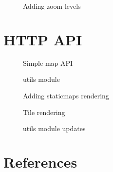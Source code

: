 \documentclass[letterpaper]{article}
\begin{document}
\begin{figure}[h]
  \centering
  
  \caption{Adding zoom levels}
  \label{fig:xml-zooms}
\end{figure}

\pagebreak

\section{HTTP API}
\label{sec:http-api}

\begin{figure}[h]
  \centering
  
  \caption{Simple map API}
  \label{fig:simple-server}
\end{figure}

\begin{figure}
  \centering
  
  \caption{utils module}
  \label{fig:utils-module}
\end{figure}

\begin{figure}
  \centering
  
  \caption{Adding staticmaps rendering}
  \label{fig:staticmaps-rendering}
\end{figure}

\begin{figure}
  \centering
  
  \caption{Tile rendering}
  \label{fig:tile-rendering}
\end{figure}

\begin{figure}
  \centering
  
  \caption{utils module updates}
  \label{fig:tile-utils}
\end{figure}

\pagebreak

\section{References}

\end{document}
